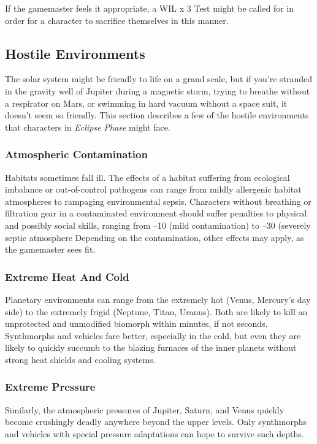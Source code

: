 If the gamemaster feels it appropriate, a WIL x 3 
Test might be called for in order for a character to 
sacrifice themselves in this manner.

\subsection{Hostile Environments}


The solar system might be friendly to life on a grand 
scale, but if you're stranded in the gravity well of Jupiter
during a magnetic storm, trying to breathe without
a respirator on Mars, or swimming in hard vacuum 
without a space suit, it doesn't seem so friendly. This 
section describes a few of the hostile environments 
that characters in \textit{Eclipse Phase} might face.

\subsubsection{Atmospheric Contamination}

Habitats sometimes fall ill. The effects of a habitat 
suffering from ecological imbalance or out-of-control 
pathogens can range from mildly allergenic habitat 
atmospheres to rampaging environmental sepsis. 
Characters without breathing or filtration gear in a 
contaminated environment should suffer penalties 
to physical and possibly social skills, ranging from 
–10 (mild contamination) to –30 (severely septic atmosphere
Depending on the contamination, other
effects may apply, as the gamemaster sees fit.

\subsubsection{Extreme Heat And Cold}

Planetary environments can range from the extremely 
hot (Venus, Mercury's day side) to the extremely frigid 
(Neptune, Titan, Uranus). Both are likely to kill an unprotected
and unmodified biomorph within minutes, if
not seconds. Synthmorphs and vehicles fare better, especially
in the cold, but even they are likely to quickly
succumb to the blazing furnaces of the inner planets 
without strong heat shields and cooling systems.

\subsubsection{Extreme Pressure}


Similarly, the atmospheric pressures of Jupiter, 
Saturn, and Venus quickly become crushingly deadly 
anywhere beyond the upper levels. Only synthmorphs 
and vehicles with special pressure adaptations can 
hope to survive such depths.

